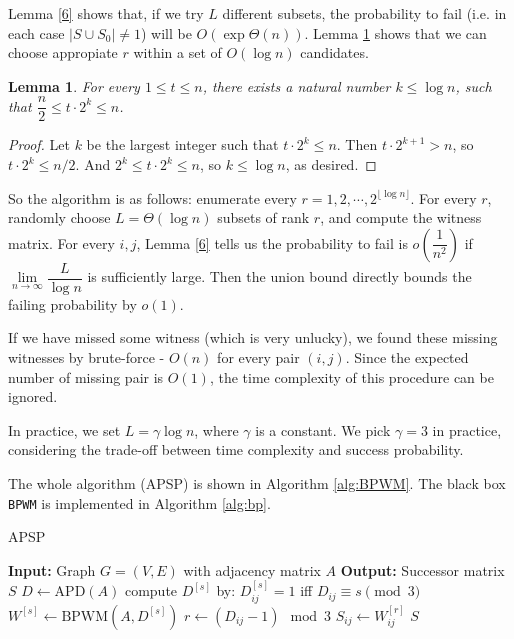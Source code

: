 \documentclass[12pt]{article}
\newtheorem{lemma}{Lemma}
\begin{document}
Lemma \ref{6} shows that, if we try $L$ different subsets, the probability to fail (i.e. in each case $|S\cup S_0|\not=1$) will be $O(\exp{\Theta(n)})$. Lemma \ref{7} shows that we can choose appropiate $r$ within a set of $O(\log n)$ candidates.

\begin{lemma}
\label{7}
For every $1\le t\le n$, there exists a natural number $k\le \log n$, such that $\dfrac{n}{2}\le t\cdot 2^k\le n$.
\end{lemma}
\begin{proof}
Let $k$ be the largest integer such that $t\cdot 2^k\le n$. Then $t\cdot 2^{k+1}>n$, so $t\cdot 2^k\le n/2$. And $2^k\le t\cdot 2^k\le n$, so $k\le \log n$, as desired.
\end{proof}

So the algorithm is as follows: enumerate every $r=1,2,\cdots,2^{\lfloor\log n\rfloor}$. For every $r$, randomly choose $L=\Theta(\log n)$ subsets of rank $r$, and compute the witness matrix. For every $i,j$, Lemma \ref{6} tells us the probability to fail is $o(\dfrac{1}{n^2})$ if $\lim\limits_{n\to \infty}\dfrac{L}{\log n}$ is sufficiently large. Then the union bound directly bounds the failing probability by $o(1)$.

If we have missed some witness (which is very unlucky), we found these missing witnesses by brute-force - $O(n)$ for every pair $(i,j)$. Since the expected number of missing pair is $O(1)$, the time complexity of this procedure can be ignored.

In practice, we set $L=\gamma\log n$, where $\gamma$ is a constant. We pick $\gamma=3$ in practice, considering the trade-off between time complexity and success probability. 

The whole algorithm (APSP) is shown in Algorithm \ref{alg:BPWM}. The black box \texttt{BPWM} is implemented in Algorithm \ref{alg:bp}.

\begin{algorithm}
    \caption{APSP}
    \label{alg:BPWM}
    \begin{algorithmic}
        \STATE \textbf{Input:} Graph $G=(V,E)$ with adjacency matrix $A$
        \STATE \textbf{Output:} Successor matrix $S$
        \STATE $D\leftarrow \text{APD}(A)$
            \STATE compute $D^{[s]}$ by: $D^{[s]}_{ij}=1$ iff $D_{ij}\equiv s\pmod 3$
            \STATE $W^{[s]}\leftarrow \text{BPWM}(A,D^{[s]})$
        \ENDFOR
                \STATE $r\leftarrow (D_{ij}-1)\mod 3$
                \STATE $S_{ij}\leftarrow W^{[r]}_{ij}$
            \ENDFOR
        \ENDFOR
    \RETURN $S$
    \end{algorithmic}
\end{algorithm}
\end{document}
